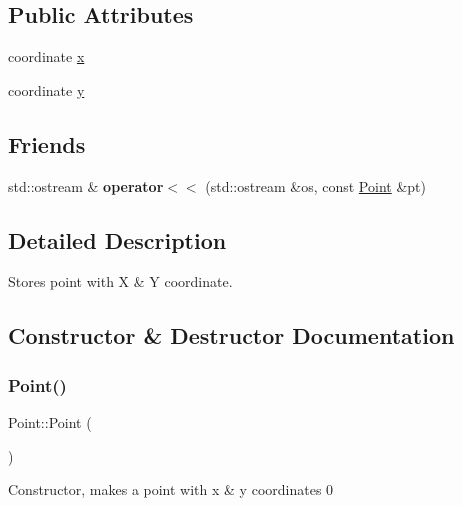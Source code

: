 \subsection*{Public Attributes}
\begin{DoxyCompactItemize}
\item 
coordinate \hyperlink{classPoint_a2e5bf2da8d7f35ef2ca707ae5ec1929b}{x}
\item 
coordinate \hyperlink{classPoint_a4390d37c7ed19ad07212fc84df2fe26e}{y}
\end{DoxyCompactItemize}
\subsection*{Friends}
\begin{DoxyCompactItemize}
\item 
\mbox{\label{classPoint_a2c120859855730a5ff9d2eaee48471c5}} 
std\+::ostream \& {\bfseries operator$<$$<$} (std\+::ostream \&os, const \hyperlink{classPoint}{Point} \&pt)
\end{DoxyCompactItemize}


\subsection{Detailed Description}
Stores point with X \& Y coordinate. 

\subsection{Constructor \& Destructor Documentation}
\mbox{\label{classPoint_ad92f2337b839a94ce97dcdb439b4325a}} 
\subsubsection{\texorpdfstring{Point()}{Point()}\hspace{0.1cm}{\footnotesize\ttfamily [1/2]}}
{\footnotesize\ttfamily Point\+::\+Point (\begin{DoxyParamCaption}{ }\end{DoxyParamCaption})}

Constructor, makes a point with x \& y coordinates 0 \mbox{\label{classPoint_af7373698b9fafc53b0a5d06e511642e1}} 
